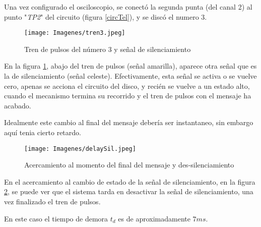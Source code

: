 Una vez configurado el osciloscopio, se conectó la segunda punta (del canal 2) al punto "\textit{TP2}" del circuito (figura \ref{circTel}), y se discó el numero 3.

\begin{figure}[H]
    \centering
        \texttt{[image: Imagenes/tren3.jpeg]}
    \caption{Tren de pulsos del número $3$ y señal de silenciamiento}
    \label{fig:disc3}
\end{figure}

En la figura \ref{fig:disc3}, abajo del tren de pulsos (señal amarilla), aparece otra señal que es la de silenciamiento (señal celeste). Efectivamente, esta señal se activa o se vuelve cero, apenas se acciona el circuito del disco, y recién se vuelve a un estado alto, cuando el mecanismo termina su recorrido y el tren de pulsos con el mensaje ha acabado. 

Idealmente este cambio al final del mensaje debería ser instantaneo, sin embargo aquí tenia cierto retardo. 

\begin{figure}[H]
    \centering
        \texttt{[image: Imagenes/delaySil.jpeg]}
    \caption{Acercamiento al momento del final del mensaje y des-silenciamiento}
    \label{fig:delaySil}
\end{figure}

En el acercamiento al cambio de estado de la señal de silenciamiento, en la figura \ref{fig:delaySil}, se puede ver que el sistema tarda en desactivar la señal de silenciamiento, una vez finalizado el tren de pulsos.

En este caso el tiempo de demora $t_d$ es de aproximadamente \textbf{$7 ms$}. 







